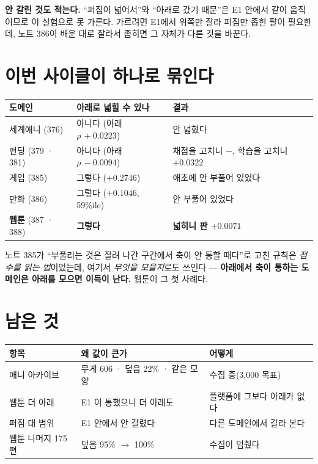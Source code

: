 \documentclass[11pt]{article}
\begin{document}
\textbf{안 갈린 것도 적는다.} ``퍼짐이 넓어서''와 ``아래로 갔기 때문''은
E1 안에서 같이 움직이므로 이 실험으로 못 가른다. 가르려면 E1에서 위쪽만
잘라 퍼짐만 좁힌 팔이 필요한데, 노트 386이 배운 대로 잘라서 좁히면 그
자체가 다른 것을 바꾼다.

\section{이번 사이클이 하나로 묶인다}

\begin{center}
\begin{tabular}{lll}
\hline
도메인 & 아래로 넓힐 수 있나 & 결과 \\
\hline
세계애니 (376) & 아니다 (아래 $\rho\,{+}0.0223$) & 안 넓혔다 \\
펀딩 (379 · 381) & 아니다 (아래 $\rho\,{-}0.0094$) & 채점을 고치니 $-$, 학습을 고치니 $+0.0322$ \\
게임 (385) & 그렇다 ($+0.2746$) & 애초에 안 부풀어 있었다 \\
만화 (386) & 그렇다 ($+0.1046$, 59\%ile) & 안 부풀어 있었다 \\
\textbf{웹툰} (387 · 388) & \textbf{그렇다} & \textbf{넓히니 판 $+0.0071$} \\
\hline
\end{tabular}
\end{center}

노트 385가 ``부풀리는 것은 잘려 나간 구간에서 축이 안 통할 때다''로
고친 규칙은 \emph{점수를 읽는 법}이었는데, 여기서 \emph{무엇을 모을지}로도
쓰인다 --- \textbf{아래에서 축이 통하는 도메인은 아래를 모으면 이득이
난다.} 웹툰이 그 첫 사례다.

\section{남은 것}

\begin{center}
\begin{tabular}{lll}
\hline
항목 & 왜 값이 큰가 & 어떻게 \\
\hline
애니 아카이브 & 무게 606 · 덮음 22\% · 같은 모양 & 수집 중(3,000 목표) \\
웹툰 더 아래 & E1 이 통했으니 더 아래도 & 플랫폼에 그보다 아래가 없다 \\
퍼짐 대 범위 & E1 안에서 안 갈렸다 & 다른 도메인에서 갈라 본다 \\
웹툰 나머지 175편 & 덮음 95\% $\to$ 100\% & 수집이 멈췄다 \\
\hline
\end{tabular}
\end{center}
\end{document}
